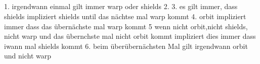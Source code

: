 \documentclass[a4paper,12pt]{scrartcl}
\begin{document}
\subsection{}
1. irgendwann einmal gilt immer warp oder shields
2.
3. es gilt immer, dass shields impliziert shields until das nächtse mal warp kommt
4. orbit impliziert immer dass das übernächste mal warp kommt
5 wenn nicht orbit,nicht shields, nicht warp und das übernchste mal nicht orbit kommt impliziert dies immer dass iwann mal shields kommt
6. beim überübernächsten Mal gilt irgendwann orbit und nicht warp
%
\end{document}
